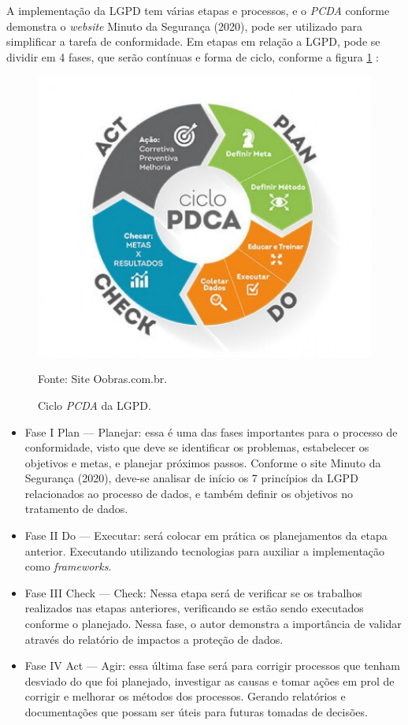 \documentclass[
	12pt,				%
	openright,			%
	oneside,			%
	a4paper,			%
	english,			%
	french,				%
	spanish,			%
	brazil,				%
	]{abntex2}
\begin{document}
A implementação da LGPD tem várias etapas e processos, e o \textit{PCDA} conforme demonstra o \textit{website} Minuto da Segurança (2020), pode ser utilizado para simplificar a tarefa de conformidade. Em etapas em relação a LGPD, pode se dividir em 4 fases, que serão contínuas e forma de ciclo, conforme a figura \ref{fig: PCDA } :

\begin{figure}[ht]
    \centering
    \caption{Ciclo \textit{PCDA} da LGPD.}
    \includegraphics[width=6.0in]{Images/05PCDA.png}
    
    \label{fig: PCDA }
    \centering \small Fonte: Site Oobras.com.br.
\end{figure}

\begin{itemize}
\item Fase I  Plan — Planejar: essa é uma das fases importantes para o processo de conformidade, visto que deve se identificar os problemas, estabelecer os objetivos e metas, e planejar próximos passos. Conforme o site Minuto da Segurança (2020), deve-se analisar de início os 7 princípios da LGPD relacionados ao processo de dados, e também definir os objetivos no tratamento de dados.
\item Fase II Do — Executar: será colocar em prática os planejamentos da etapa anterior. Executando utilizando tecnologias para auxiliar a implementação como \textit{frameworks}.
\item Fase III Check — Check: Nessa etapa será de verificar se os trabalhos realizados nas etapas anteriores, verificando se estão sendo executados conforme o planejado. Nessa fase, o autor demonstra a importância de validar através do relatório de impactos a proteção de dados.
\item Fase IV Act — Agir:  essa última fase será para corrigir processos que tenham desviado do que foi planejado, investigar as causas e tomar ações em prol de corrigir e melhorar os métodos dos processos. Gerando relatórios e documentações que possam ser úteis para futuras tomadas de decisões.
\end{itemize}
\end{document}

